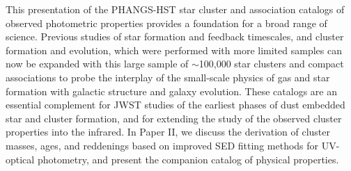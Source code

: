 \documentclass[linenumbers]{aastex63}
\begin{document}
\begin{enumerate}

\end{enumerate}

This presentation of the PHANGS-HST star cluster and association catalogs of observed photometric properties provides a foundation for a broad range of science. Previous studies of star formation and feedback timescales, and cluster formation and evolution, which were performed with more limited samples can now be expanded with this large sample of $\sim$100,000 star clusters and compact associations to probe the interplay of the small-scale physics of gas and star formation with galactic structure and galaxy evolution.  These catalogs are an essential complement for JWST studies of the earliest phases of dust embedded star and cluster formation, and for extending the study of the observed cluster properties into the infrared.  In Paper II, we discuss the derivation of cluster masses, ages, and reddenings based on improved SED fitting methods for UV-optical photometry, and present the companion catalog of physical properties.  





 

 
\end{document}
